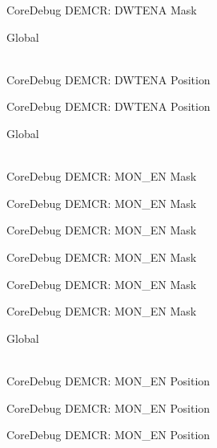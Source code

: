 \begin{DoxyRefList}
\label{deprecated__deprecated000273}%
%
Core\+Debug DEMCR\+: DWTENA Mask  
\item[{\parbox[t]{\linewidth}{Global \doxylink{group___c_m_s_i_s___core_debug_ga0cde79c4e741e1eed0513c1f985baeb9}{Core\+Debug\+\_\+\+DEMCR\+\_\+\+DWTENA\+\_\+\+Pos} }}]\hfill \\
\label{deprecated__deprecated000133}%
%
Core\+Debug DEMCR\+: DWTENA Position 

\label{deprecated__deprecated000272}%
%
Core\+Debug DEMCR\+: DWTENA Position  
\item[{\parbox[t]{\linewidth}{Global \doxylink{group___c_m_s_i_s___core_debug_gac2b46b9b65bf8d23027f255fc9641977}{Core\+Debug\+\_\+\+DEMCR\+\_\+\+MON\+\_\+\+EN\+\_\+\+Msk} }}]\hfill \\
\label{deprecated__deprecated000054}%
%
Core\+Debug DEMCR\+: MON\+\_\+\+EN Mask 

\label{deprecated__deprecated000198}%
%
Core\+Debug DEMCR\+: MON\+\_\+\+EN Mask 

\label{deprecated__deprecated000340}%
%
Core\+Debug DEMCR\+: MON\+\_\+\+EN Mask 

\label{deprecated__deprecated000416}%
%
Core\+Debug DEMCR\+: MON\+\_\+\+EN Mask 

\label{deprecated__deprecated000505}%
%
Core\+Debug DEMCR\+: MON\+\_\+\+EN Mask 

\label{deprecated__deprecated000607}%
%
Core\+Debug DEMCR\+: MON\+\_\+\+EN Mask  
\item[{\parbox[t]{\linewidth}{Global \doxylink{group___c_m_s_i_s___core_debug_ga802829678f6871863ae9ecf60a10425c}{Core\+Debug\+\_\+\+DEMCR\+\_\+\+MON\+\_\+\+EN\+\_\+\+Pos} }}]\hfill \\
\label{deprecated__deprecated000053}%
%
Core\+Debug DEMCR\+: MON\+\_\+\+EN Position 

\label{deprecated__deprecated000197}%
%
Core\+Debug DEMCR\+: MON\+\_\+\+EN Position 

\label{deprecated__deprecated000339}%
%
Core\+Debug DEMCR\+: MON\+\_\+\+EN Position 


\end{DoxyRefList}

